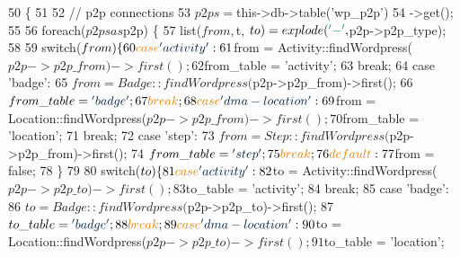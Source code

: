 \begin{DoxyCode}
50     \{  
51 
52         \textcolor{comment}{// p2p connections}
53         $p2ps = $this->db->table(\textcolor{stringliteral}{'wp\_p2p'})
54             ->get();
55 
56         \textcolor{keywordflow}{foreach}($p2ps as $p2p) \{
57             list($from, $t, $to) = explode(\textcolor{charliteral}{'-'}, $p2p->p2p\_type);
58 
59             \textcolor{keywordflow}{switch}($from) \{
60                 \textcolor{keywordflow}{case} \textcolor{stringliteral}{'activity'}:
61                     $from = Activity::findWordpress($p2p->p2p\_from)->first();
62                     $from\_table = \textcolor{stringliteral}{'activity'};
63                     \textcolor{keywordflow}{break};
64                 \textcolor{keywordflow}{case} \textcolor{stringliteral}{'badge'}:
65                     $from = Badge::findWordpress($p2p->p2p\_from)->first();
66                     $from\_table = \textcolor{stringliteral}{'badge'};
67                     \textcolor{keywordflow}{break};
68                 \textcolor{keywordflow}{case} \textcolor{stringliteral}{'dma-location'}:
69                     $from = Location::findWordpress($p2p->p2p\_from)->first();
70                     $from\_table = \textcolor{stringliteral}{'location'};
71                     \textcolor{keywordflow}{break};
72                 \textcolor{keywordflow}{case} \textcolor{stringliteral}{'step'}:
73                     $from = Step::findWordpress($p2p->p2p\_from)->first();
74                     $from\_table = \textcolor{stringliteral}{'step'};
75                     \textcolor{keywordflow}{break};
76                 \textcolor{keywordflow}{default}:
77                     $from = \textcolor{keyword}{false};
78             \}
79 
80             \textcolor{keywordflow}{switch}($to) \{
81                 \textcolor{keywordflow}{case} \textcolor{stringliteral}{'activity'}:
82                     $to = Activity::findWordpress($p2p->p2p\_to)->first();
83                     $to\_table = \textcolor{stringliteral}{'activity'};
84                     \textcolor{keywordflow}{break};
85                 \textcolor{keywordflow}{case} \textcolor{stringliteral}{'badge'}:
86                     $to = Badge::findWordpress($p2p->p2p\_to)->first();
87                     $to\_table = \textcolor{stringliteral}{'badge'};
88                     \textcolor{keywordflow}{break};
89                 \textcolor{keywordflow}{case} \textcolor{stringliteral}{'dma-location'}:
90                     $to = Location::findWordpress($p2p->p2p\_to)->first();
91                     $to\_table = \textcolor{stringliteral}{'location'};

\end{DoxyCode}
